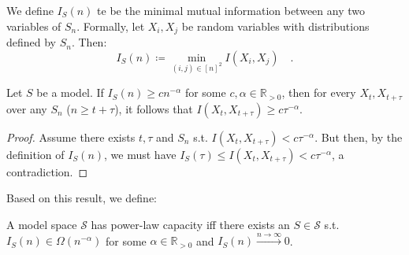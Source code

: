 \documentclass[../../main.tex]{subfiles}
\begin{document}
    \begin{definition}
        We define $I_S(n)$ te be the minimal mutual information between any two variables of $S_n$. Formally, let $X_i, X_j$ be random variables with distributions defined by $S_n$. Then:
        \[
            I_S(n) \coloneqq \min_{(i, j) \in [n]^2} I(X_i, X_j) \quad .
        \]
    \end{definition}

    \begin{theorem}
        Let $S$ be a model. If $I_S(n) \geq c n^{-\alpha}$ for some $c, \alpha \in \mathbb{R}_{>0}$, then for every $X_t, X_{t + \tau}$ over any $S_n$ ($n \geq t + \tau$), it follows that $I(X_t, X_{t + \tau}) \geq c\tau^{-\alpha}$.
    \end{theorem}

    \begin{proof}
        Assume there exists $t, \tau$ and $S_n$ s.t. $I(X_t, X_{t + \tau}) < c\tau^{-\alpha}$. But then, by the definition of $I_S(n)$, we must have $I_S(\tau)\leq I(X_t, X_{t + \tau}) < c\tau^{-\alpha}$, a contradiction.
    \end{proof}

    Based on this result, we define:

    \begin{definition}
        A model space $\mathcal{S}$ has power-law capacity iff there exists an $S \in \mathcal{S}$ s.t. $I_S(n) \in \Omega(n^{-\alpha})$ for some $\alpha \in \mathbb{R}_{>0}$ and $I_S(n) \xrightarrow{n \to \infty} 0$.
    \end{definition}
\end{document}
